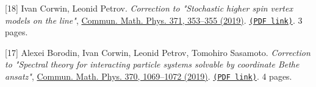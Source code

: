 \begin{etaremune}
\item[{[18]}] 
Ivan Corwin, Leonid Petrov.
\emph{Correction to "Stochastic higher spin vertex models on the line"}, \href{https://link.springer.com/article/10.1007/s00220-019-03532-2}{Commun. Math. Phys. 371, 353–355 (2019)}. 
 \href{https://storage.lpetrov.cc/papers/18-correction_to_stochastic.pdf}{\texttt{(PDF link)}}. 3 pages.



\item[{[17]}] 
Alexei Borodin, Ivan Corwin, Leonid Petrov, Tomohiro Sasamoto.
\emph{Correction to "Spectral theory for interacting particle systems solvable by coordinate Bethe ansatz"}, \href{https://link.springer.com/article/10.1007/s00220-019-03528-y}{Commun. Math. Phys. 370, 1069–1072 (2019)}. 
 \href{https://storage.lpetrov.cc/papers/17-correction_to_spectral.pdf}{\texttt{(PDF link)}}. 4 pages.

















































































\end{etaremune}
